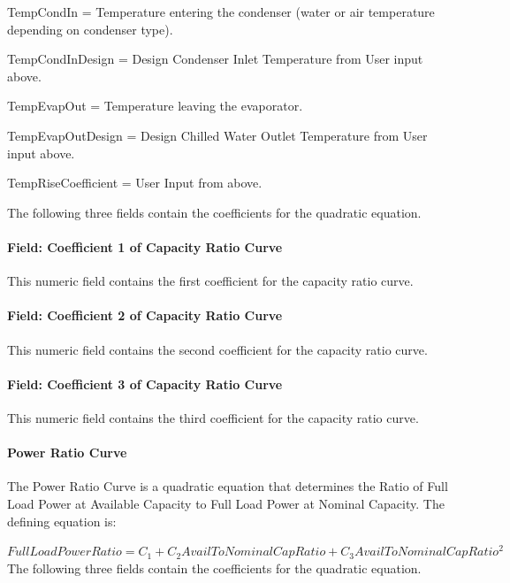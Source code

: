 TempCondIn = Temperature entering the condenser (water or air temperature depending on condenser type).

TempCondInDesign = Design Condenser Inlet Temperature from User input above.

TempEvapOut = Temperature leaving the evaporator.

TempEvapOutDesign = Design Chilled Water Outlet Temperature from User input above.

TempRiseCoefficient = User Input from above.

The following three fields contain the coefficients for the quadratic equation.

\paragraph{Field: Coefficient 1 of Capacity Ratio Curve}\label{field-coefficient-1-of-capacity-ratio-curve}

This numeric field contains the first coefficient for the capacity ratio curve.

\paragraph{Field: Coefficient 2 of Capacity Ratio Curve}\label{field-coefficient-2-of-capacity-ratio-curve}

This numeric field contains the second coefficient for the capacity ratio curve.

\paragraph{Field: Coefficient 3 of Capacity Ratio Curve}\label{field-coefficient-3-of-capacity-ratio-curve}

This numeric field contains the third coefficient for the capacity ratio curve.

\paragraph{Power Ratio Curve}\label{power-ratio-curve}

The Power Ratio Curve is a quadratic equation that determines the Ratio of Full Load Power at Available Capacity to Full Load Power at Nominal Capacity. The defining equation is:

\(FullLoadPowerRatio = {C_1} + {C_2}AvailToNominalCapRatio + {C_3}AvailToNominalCapRati{o^2}\) The following three fields contain the coefficients for the quadratic equation.

